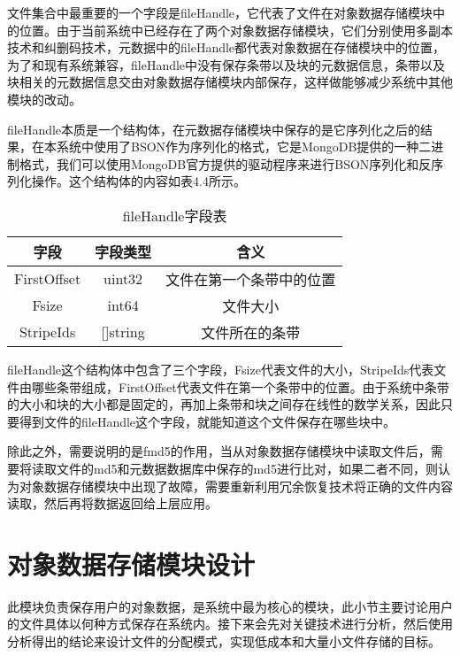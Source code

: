 文件集合中最重要的一个字段是fileHandle，它代表了文件在对象数据存储模块中的位置。由于当前系统中已经存在了两个对象数据存储模块，它们分别使用多副本技术和纠删码技术，元数据中的fileHandle都代表对象数据在存储模块中的位置，为了和现有系统兼容，fileHandle中没有保存条带以及块的元数据信息，条带以及块相关的元数据信息交由对象数据存储模块内部保存，这样做能够减少系统中其他模块的改动。

fileHandle本质是一个结构体，在元数据存储模块中保存的是它序列化之后的结果，在本系统中使用了BSON作为序列化的格式，它是MongoDB提供的一种二进制格式，我们可以使用MongoDB官方提供的驱动程序来进行BSON序列化和反序列化操作。这个结构体的内容如表4.4所示。

\begin{table}[h]
  \centering
  \vspace{10pt}
  \caption{fileHandle字段表}
  \vspace{-15pt}
  \begin{tabular}{ccc}
    \toprule
    字段   & 字段类型   & 含义                          \\
    \midrule
    FirstOffset & uint32     & 文件在第一个条带中的位置                 \\
    Fsize       & int64      & 文件大小                \\
    StripeIds   & []string   & 文件所在的条带         \\
    \bottomrule
  \end{tabular}
\end{table}

fileHandle这个结构体中包含了三个字段，Fsize代表文件的大小，StripeIds代表文件由哪些条带组成，FirstOffset代表文件在第一个条带中的位置。由于系统中条带的大小和块的大小都是固定的，再加上条带和块之间存在线性的数学关系，因此只要得到文件的fileHandle这个字段，就能知道这个文件保存在哪些块中。

除此之外，需要说明的是fmd5的作用，当从对象数据存储模块中读取文件后，需要将读取文件的md5和元数据数据库中保存的md5进行比对，如果二者不同，则认为对象数据存储模块中出现了故障，需要重新利用冗余恢复技术将正确的文件内容读取，然后再将数据返回给上层应用。

\section{对象数据存储模块设计}
此模块负责保存用户的对象数据，是系统中最为核心的模块，此小节主要讨论用户的文件具体以何种方式保存在系统内。接下来会先对关键技术进行分析，然后使用分析得出的结论来设计文件的分配模式，实现低成本和大量小文件存储的目标。

